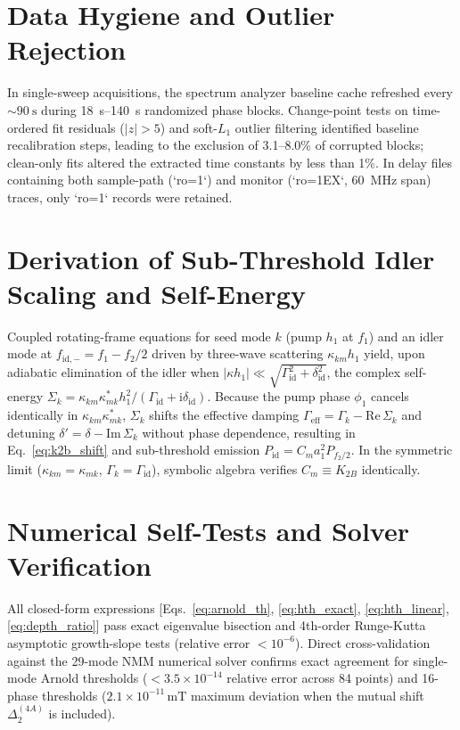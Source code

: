 \documentclass[aps,prb,reprint,superscriptaddress,floatfix]{revtex4-2}
\newcommand{\ii}{\mathrm{i}}
\newcommand{\Gid}{\Gamma_{\mathrm{id}}}
\begin{document}
\section{Data Hygiene and Outlier Rejection}\label{app:data}

In single-sweep acquisitions, the spectrum analyzer baseline cache refreshed every $\sim\SI{90}{\second}$ during \SIrange{18}{140}{\second} randomized phase blocks. Change-point tests on time-ordered fit residuals ($|z|>5$) and soft-$L_1$ outlier filtering identified baseline recalibration steps, leading to the exclusion of 3.1--8.0\% of corrupted blocks; clean-only fits altered the extracted time constants by less than 1\%. In delay files containing both sample-path (`ro=1`) and monitor (`ro=1EX`, \SI{60}{\mega\hertz} span) traces, only `ro=1` records were retained.

\section{Derivation of Sub-Threshold Idler Scaling and Self-Energy}\label{app:idler}

Coupled rotating-frame equations for seed mode $k$ (pump $h_1$ at $f_1$) and an idler mode at $f_{\mathrm{id},-}=f_1-f_2/2$ driven by three-wave scattering $\kappa_{km}h_1$ yield, upon adiabatic elimination of the idler when $|\kappa h_1|\ll\sqrt{\Gid^2+\delta_{\mathrm{id}}^2}$, the complex self-energy $\Sigma_k = \kappa_{km}\kappa_{mk}^* h_1^2 / (\Gid + \ii\delta_{\mathrm{id}})$. Because the pump phase $\phi_1$ cancels identically in $\kappa_{km}\kappa_{mk}^*$, $\Sigma_k$ shifts the effective damping $\Gamma_{\mathrm{eff}}=\Gamma_k - \mathrm{Re}\,\Sigma_k$ and detuning $\delta'=\delta-\mathrm{Im}\,\Sigma_k$ without phase dependence, resulting in Eq.~\eqref{eq:k2b_shift} and sub-threshold emission $P_{\mathrm{id}}=C_m a_1^2 P_{f_2/2}$. In the symmetric limit ($\kappa_{km}=\kappa_{mk}$, $\Gamma_k=\Gid$), symbolic algebra verifies $C_m \equiv K_{2B}$ identically.

\section{Numerical Self-Tests and Solver Verification}\label{app:tests}

All closed-form expressions [Eqs.~\eqref{eq:arnold_th}, \eqref{eq:hth_exact}, \eqref{eq:hth_linear}, \eqref{eq:depth_ratio}] pass exact eigenvalue bisection and 4th-order Runge-Kutta asymptotic growth-slope tests (relative error $<10^{-6}$). Direct cross-validation against the 29-mode NMM numerical solver confirms exact agreement for single-mode Arnold thresholds ($<3.5\times 10^{-14}$ relative error across 84 points) and 16-phase thresholds ($2.1\times 10^{-11}\,\text{mT}$ maximum deviation when the mutual shift $\Delta^{(4A)}_2$ is included).
\end{document}
